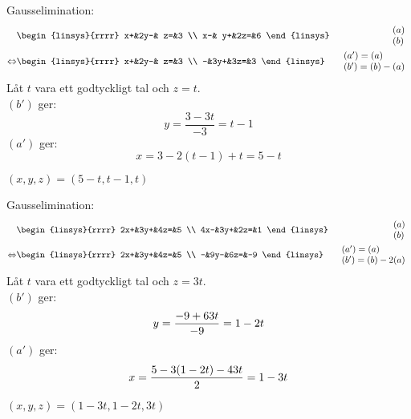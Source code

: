 \pagebreak
\begin{task}{1.13}
	Gausselimination:
	\begin{align*}
		&\begin{linsys}{rrrr}
			x+&2y-& z=&3 \\
			x-& y+&2z=&6
		\end{linsys}
		&\begin{array}{l} 
		(a) \\ 
		(b) 
		\end{array} \\ \lra
		&\begin{linsys}{rrrr}
			x+&2y-& z=&3 \\
			 -&3y+&3z=&3
		\end{linsys}
		&\begin{array}{l} 
		(a')=(a) \\ 
		(b')=(b)-(a) 
		\end{array} 
	\end{align*}
	Låt $t$ vara ett godtyckligt tal och $z=t$. \\
	$(b')$ ger:
	\[y=\frac{3-3t}{-3}=t-1\]
	$(a')$ ger:
	\[x=3-2(t-1)+t=5-t\]

	\ans $(x,y,z)=(5-t,t-1,t)$
\end{task}

\begin{task}{1.14}
	Gausselimination:
	\begin{align*}
		&\begin{linsys}{rrrr}
			2x+&3y+&4z=&5 \\
			4x-&3y+&2z=&1
		\end{linsys}
		&\begin{array}{l} 
			(a) \\ 
			(b) 
		\end{array} \\ \lra
		&\begin{linsys}{rrrr}
			2x+&3y+&4z=&5 \\
			  -&9y-&6z=&-9
		\end{linsys}
		&\begin{array}{l} 
			(a')=(a) \\ 
			(b')=(b)-2(a) 
		\end{array}
	\end{align*}
	Låt $t$ vara ett godtyckligt tal och $z=3t$. \\
	$(b')$ ger:
	\[y=\frac{-9+6\*3t}{-9}=1-2t\]
	$(a')$ ger:
	\[x=\frac{5-3(1-2t)-4\*3t}{2}=1-3t\]

	\ans $(x,y,z)=(1-3t,1-2t,3t)$
\end{task}

